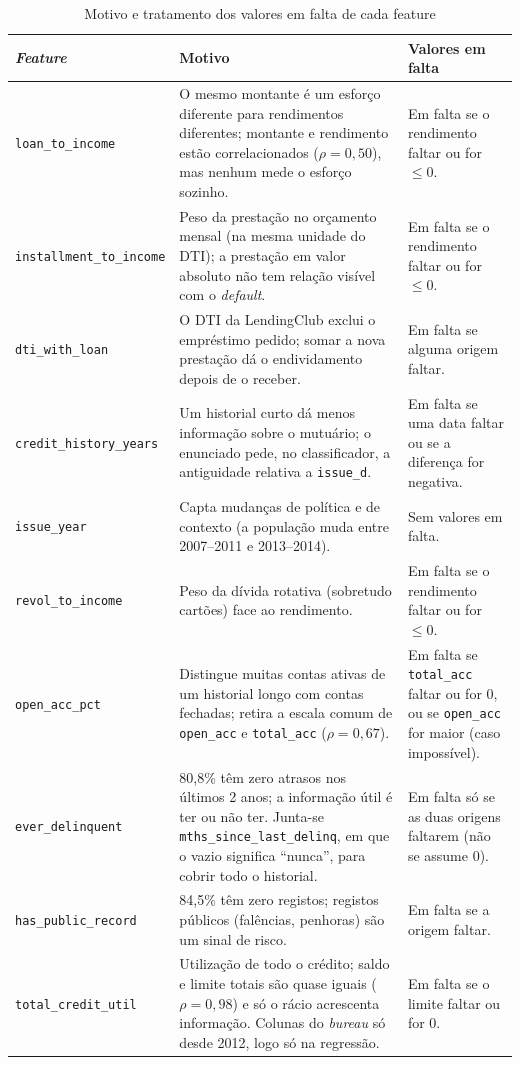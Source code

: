 \begin{table}[t]
\caption{Motivo e tratamento dos valores em falta de cada feature}
\label{tab:mod-fichas}
\centering
\footnotesize
\begin{tabular}{|p{}|p{}|p{}|}
\hline
\textbf{\textit{Feature}} & \textbf{Motivo} & \textbf{Valores em falta} \\
\hline
\texttt{loan\_to\_income} & O mesmo montante é um esforço diferente para rendimentos diferentes; montante e rendimento estão correlacionados ($\rho = 0{,}50$), mas nenhum mede o esforço sozinho. & Em falta se o rendimento faltar ou for $\leq 0$. \\
\hline
\texttt{installment\_to\_income} & Peso da prestação no orçamento mensal (na mesma unidade do DTI); a prestação em valor absoluto não tem relação visível com o \textit{default}. & Em falta se o rendimento faltar ou for $\leq 0$. \\
\hline
\texttt{dti\_with\_loan} & O DTI da LendingClub exclui o empréstimo pedido; somar a nova prestação dá o endividamento depois de o receber. & Em falta se alguma origem faltar. \\
\hline
\texttt{credit\_history\_years} & Um historial curto dá menos informação sobre o mutuário; o enunciado pede, no classificador, a antiguidade relativa a \texttt{issue\_d}. & Em falta se uma data faltar ou se a diferença for negativa. \\
\hline
\texttt{issue\_year} & Capta mudanças de política e de contexto (a população muda entre 2007--2011 e 2013--2014). & Sem valores em falta. \\
\hline
\texttt{revol\_to\_income} & Peso da dívida rotativa (sobretudo cartões) face ao rendimento. & Em falta se o rendimento faltar ou for $\leq 0$. \\
\hline
\texttt{open\_acc\_pct} & Distingue muitas contas ativas de um historial longo com contas fechadas; retira a escala comum de \texttt{open\_acc} e \texttt{total\_acc} ($\rho = 0{,}67$). & Em falta se \texttt{total\_acc} faltar ou for 0, ou se \texttt{open\_acc} for maior (caso impossível). \\
\hline
\texttt{ever\_delinquent} & 80,8\% têm zero atrasos nos últimos 2 anos; a informação útil é ter ou não ter. Junta-se \texttt{mths\_since\_last\_delinq}, em que o vazio significa ``nunca'', para cobrir todo o historial. & Em falta só se as duas origens faltarem (não se assume 0). \\
\hline
\texttt{has\_public\_record} & 84,5\% têm zero registos; registos públicos (falências, penhoras) são um sinal de risco. & Em falta se a origem faltar. \\
\hline
\texttt{total\_credit\_util} & Utilização de todo o crédito; saldo e limite totais são quase iguais ($\rho = 0{,}98$) e só o rácio acrescenta informação. Colunas do \textit{bureau} só desde 2012, logo só na regressão. & Em falta se o limite faltar ou for 0. \\
\hline
\end{tabular}
\end{table}

